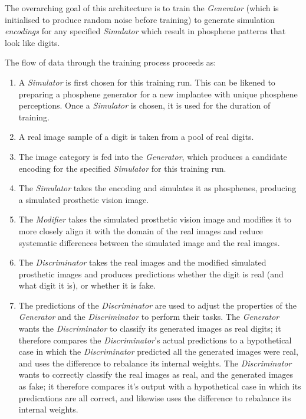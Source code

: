 \documentclass[a4paper,11pt,openany]{book}
\begin{document}
The overarching goal of this architecture is to train the \emph{Generator} (which is initialised to produce random noise before training) to generate simulation \emph{encodings} for any specified \emph{Simulator} which result in phosphene patterns that look like digits.

The flow of data through the training process proceeds as:
\begin{enumerate}
\item A \emph{Simulator} is first chosen for this training run.
This can be likened to preparing a phosphene generator for a new implantee with unique phosphene perceptions.
Once a \emph{Simulator} is chosen, it is used for the duration of training.
\item A real image sample of a digit is taken from a pool of real digits.
\item The image category is fed into the \emph{Generator}, which produces a candidate encoding for the specified \emph{Simulator} for this training run.
\item The \emph{Simulator} takes the encoding and simulates it as phosphenes, producing a simulated prosthetic vision image.
\item The \emph{Modifier} takes the simulated prosthetic vision image and modifies it to more closely align it with the domain of the real images and reduce systematic differences between the simulated image and the real images.
\item The \emph{Discriminator} takes the real images and the modified simulated prosthetic images and produces predictions whether the digit is real (and what digit it is), or whether it is fake.
\item The predictions of the \emph{Discriminator} are used to adjust the properties of the \emph{Generator} and the \emph{Discriminator} to perform their tasks.
The \emph{Generator} wants the \emph{Discriminator} to classify its generated images as real digits; it therefore compares the \emph{Discriminator}'s actual predictions to a hypothetical case in which the \emph{Discriminator} predicted all the generated images were real, and uses the difference to rebalance its internal weights.
The \emph{Discriminator} wants to correctly classify the real images as real, and the generated images as fake; it therefore compares it's output with a hypothetical case in which its predications are all correct, and likewise uses the difference to rebalance its internal weights.
\end{enumerate}
\end{document}
